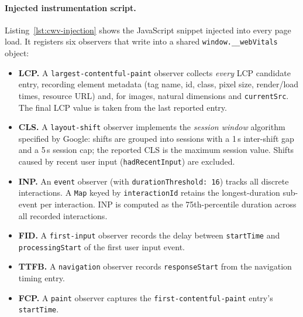 \paragraph{Injected instrumentation script.}
Listing~\ref{lst:cwv-injection} shows the JavaScript snippet injected into every page load. It registers six observers that write into a shared \texttt{window.\_\_webVitals} object:

\begin{itemize}
    \item \textbf{LCP.} A \texttt{largest-contentful-paint} observer collects \emph{every} LCP candidate entry, recording element metadata (tag name, id, class, pixel size, render/load times, resource URL) and, for images, natural dimensions and \texttt{currentSrc}. The final LCP value is taken from the last reported entry.
    \item \textbf{CLS.} A \texttt{layout-shift} observer implements the \emph{session window} algorithm specified by Google: shifts are grouped into sessions with a 1\,s inter-shift gap and a 5\,s session cap; the reported CLS is the maximum session value. Shifts caused by recent user input (\texttt{hadRecentInput}) are excluded.
    \item \textbf{INP.} An \texttt{event} observer (with \texttt{durationThreshold: 16}) tracks all discrete interactions. A \texttt{Map} keyed by \texttt{interactionId} retains the longest-duration sub-event per interaction. INP is computed as the 75th-percentile duration across all recorded interactions.
    \item \textbf{FID.} A \texttt{first-input} observer records the delay between \texttt{startTime} and \texttt{processingStart} of the first user input event.
    \item \textbf{TTFB.} A \texttt{navigation} observer records \texttt{responseStart} from the navigation timing entry.
    \item \textbf{FCP.} A \texttt{paint} observer captures the \texttt{first-contentful-paint} entry's \texttt{startTime}.
\end{itemize}
\label{sec:cwv-injection}

